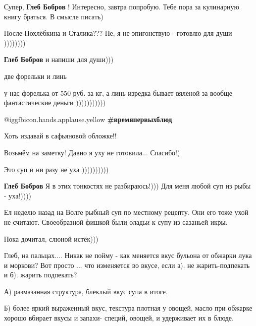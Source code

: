 \begin{itemize}
\begin{itemize}
\end{itemize} %

Супер, \textbf{Глеб Бобров} !
Интересно, завтра попробую. Тебе пора за кулинарную книгу браться. В смысле писать)

\begin{itemize} %
После Похлёбкина и Сталика???
Не, я не эпигонствую - готовлю для души ))))))))

\textbf{Глеб Бобров} и напиши для души)))
\end{itemize} %

две форельки и линь

\begin{itemize} %
у нас форелька от 550 руб. за кг, а линь изредка бывает вяленой за вообще фантастические деньги )))))))))))
\end{itemize} %

 @igg{fbicon.hands.applause.yellow}  \textbf{\#времяпервыхблюд}

Хоть издавай в сафьяновой обложке!!

Возьмём на заметку! Давно я уху не готовила... Спасибо!)

\begin{itemize} %
Это суп и ни разу не уха ))))))))))

\textbf{Глеб Бобров} Я в этих тонкостях не разбираюсь!))) Для меня любой суп из рыбы - уха!))))
\end{itemize} %


Ел неделю назад на Волге рыбный суп по местному рецепту. Они его тоже ухой не
считают. Своеобразной фишкой были оладьи к супу из сазаньей икры.


Пока дочитал, слюной истёк)))


Глеб, на пальцах.... Никак не пойму - как меняется вкус бульона от обжарки лука
и моркови? Вот просто ... что изменяется во вкусе, если а). не жарить-подпекать
и б). жарить подпекать?

\begin{itemize} %

А) размазанная структура, блеклый вкус супа в итоге.

Б) более яркий выраженный вкус, текстура плотная у овощей, масло при обжарке
хорошо вбирает вкусы и запахи- специй, овощей, и удерживает их в блюде.


\end{itemize}
\end{itemize}
